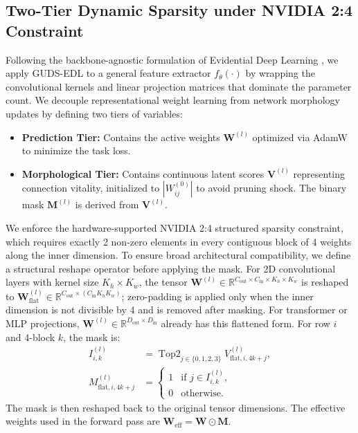 \documentclass[letterpaper]{article} %
\newcommand{\R}{\mathbb{R}}
\DeclareMathOperator{\TopTwo}{Top2}
\begin{document}
\subsection{Two-Tier Dynamic Sparsity under NVIDIA 2:4 Constraint}
Following the backbone-agnostic formulation of Evidential Deep Learning \cite{sensoy2018evidential}, we apply GUDS-EDL to a general feature extractor $f_\theta(\cdot)$ by wrapping the convolutional kernels and linear projection matrices that dominate the parameter count. We decouple representational weight learning from network morphology updates by defining two tiers of variables:
\begin{itemize}
    \item \textbf{Prediction Tier:} Contains the active weights $\bm{W}^{(l)}$ optimized via AdamW to minimize the task loss.
    \item \textbf{Morphological Tier:} Contains continuous latent scores $\bm{V}^{(l)}$ representing connection vitality, initialized to $|W_{ij}^{(0)}|$ to avoid pruning shock. The binary mask $\bm{M}^{(l)}$ is derived from $\bm{V}^{(l)}$.
\end{itemize}
We enforce the hardware-supported NVIDIA 2:4 structured sparsity constraint, which requires exactly 2 non-zero elements in every contiguous block of 4 weights along the inner dimension. To ensure broad architectural compatibility, we define a structural reshape operator before applying the mask. For 2D convolutional layers with kernel size $K_h \times K_w$, the tensor $\bm{W}^{(l)} \in \R^{C_{\text{out}} \times C_{\text{in}} \times K_h \times K_w}$ is reshaped to $\bm{W}_{\text{flat}}^{(l)} \in \R^{C_{\text{out}} \times (C_{\text{in}}K_hK_w)}$; zero-padding is applied only when the inner dimension is not divisible by 4 and is removed after masking. For transformer or MLP projections, $\bm{W}^{(l)} \in \R^{D_{\text{out}} \times D_{\text{in}}}$ already has this flattened form. For row $i$ and 4-block $k$, the mask is:
\begin{equation}\label{eq:mask}
    \begin{aligned}
    I_{i,k}^{(l)} &= \TopTwo_{j \in \{0,1,2,3\}}
    V_{\text{flat}, i, 4k+j}^{(l)},\\
    M_{\text{flat}, i, 4k+j}^{(l)} &=
    \begin{cases}
        1 & \text{if } j \in I_{i,k}^{(l)},\\
        0 & \text{otherwise.}
    \end{cases}
    \end{aligned}
\end{equation}
The mask is then reshaped back to the original tensor dimensions. The effective weights used in the forward pass are $\bm{W}_{\text{eff}} = \bm{W} \odot \bm{M}$.
\end{document}
